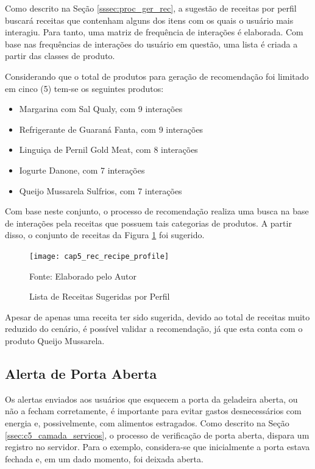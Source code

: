 Como descrito na Seção \ref{sssec:proc_ger_rec}, a sugestão de receitas por perfil buscará receitas que contenham alguns dos itens com os quais o usuário mais interagiu. Para tanto, uma matriz de frequência de interações é elaborada. Com base nas frequências de interações do usuário em questão, uma lista é criada a partir das classes de produto.

Considerando que o total de produtos para geração de recomendação foi limitado em cinco (5) tem-se os seguintes produtos:

\begin{itemize}[noitemsep,topsep=5pt]
    \item Margarina com Sal Qualy, com 9 interações
    \item Refrigerante de Guaraná Fanta, com 9 interações
    \item Linguiça de Pernil Gold Meat, com 8 interações
    \item Iogurte Danone, com 7 interações
    \item Queijo Mussarela Sulfrios, com 7 interações
\end{itemize}

Com base neste conjunto, o processo de recomendação realiza uma busca na base de interações pela receitas que possuem tais categorias de produtos. A partir disso, o conjunto de receitas da Figura \ref{fig:cap5_rec_recipe_profile} foi sugerido.



\begin{figure}[htb]
    \caption{Lista de Receitas Sugeridas por Perfil}  
    \label{fig:cap5_rec_recipe_profile}
    \texttt{[image: cap5\_rec\_recipe\_profile]}
   
    \footnotesize{Fonte: Elaborado pelo Autor}
\end{figure}

Apesar de apenas uma receita ter sido sugerida, devido ao total de receitas muito reduzido do cenário, é possível validar a recomendação, já que esta conta com o produto Queijo Mussarela.

\subsection{Alerta de Porta Aberta}

Os alertas enviados aos usuários que esquecem a porta da geladeira aberta, ou não a fecham corretamente, é importante para evitar gastos desnecessários com energia e, possivelmente, com alimentos estragados. Como descrito na Seção \ref{ssec:c5_camada_servicos}, o processo de verificação de porta aberta, dispara um registro no servidor. Para o exemplo, considera-se que inicialmente a porta estava fechada e, em um dado momento, foi deixada aberta.

